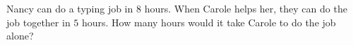 Nancy can do a typing job in $8$ hours. When Carole helps her, they can do the job together in $5$ hours. How many hours would it take Carole to do the job alone?
